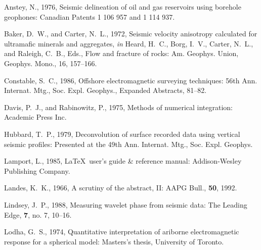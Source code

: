 \nocite{lamport}

%

\begin{thebibliography}{}

Anstey, N., 1976, Seismic delineation of oil and gas reservoirs using borehole
  geophones: Canadian Patents 1 106 957 and 1 114 937.

Baker, D.~W., and Carter, N.~L., 1972, Seismic velocity anisotropy calculated
  for ultramafic minerals and aggregates, {\it in} Heard, H.~C., Borg, I.~V.,
  Carter, N.~L.,  and Raleigh, C.~B., Eds., Flow and fracture of rocks: Am.
  Geophys. Union, Geophys. Mono., 16,  157--166.

Constable, S.~C., 1986, Offshore electromagnetic surveying techniques: 56th
  Ann. Internat. Mtg., Soc. Expl. Geophys., Expanded Abstracts,  81--82.

Davis, P.~J., and Rabinowitz, P., 1975, Methods of numerical integration:
  Academic Press Inc.

Hubbard, T.~P., 1979, Deconvolution of surface recorded data using vertical
  seismic profiles: Presented at the 49th Ann. Internat. Mtg., Soc. Expl.
  Geophys.

Lamport, L., 1985, {\LaTeX\ user's guide \& reference manual}: Addison-Wesley
  Publishing Company.

Landes, K.~K., 1966, A scrutiny of the abstract, {II}: AAPG Bull., {\bf 50},
  1992.

Lindsey, J.~P., 1988, Measuring wavelet phase from seismic data: The Leading
  Edge, {\bf 7}, no. 7, 10--16.

Lodha, G.~S., 1974, Quantitative interpretation of ariborne electromagnetic
  response for a spherical model: Masters's thesis, University of Toronto.


\end{thebibliography}
